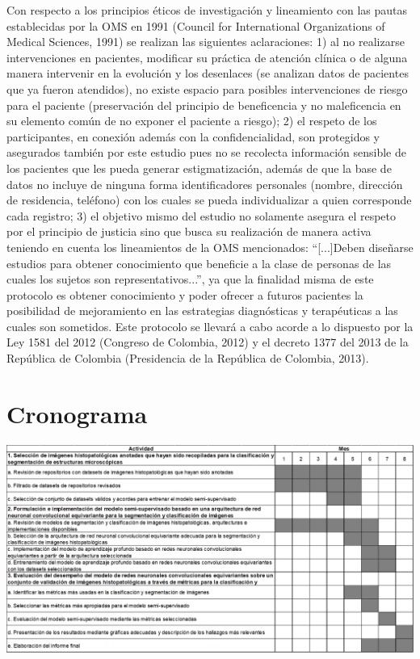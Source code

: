 \documentclass[12pt,letterpaper,final, openany]{scrbook}
\begin{document}
Con respecto a los principios éticos de investigación y lineamiento con las pautas establecidas por la OMS en 1991 (Council for International Organizations of Medical Sciences, 1991) se realizan las siguientes aclaraciones: 1) al no realizarse intervenciones en pacientes, modificar su práctica de atención clínica o de alguna manera intervenir en la evolución y los desenlaces (se analizan datos de pacientes que ya fueron atendidos), no existe espacio para posibles intervenciones de riesgo para el paciente (preservación del principio de beneficencia y no maleficencia en su elemento común de no exponer el paciente a riesgo); 2) el respeto de los participantes, en conexión además con la confidencialidad, son protegidos y asegurados también por este estudio pues no se recolecta información sensible de los pacientes que les pueda generar estigmatización, además de que la base de datos no incluye de ninguna forma identificadores personales (nombre, dirección de residencia, teléfono) con los cuales se pueda individualizar a quien corresponde cada registro; 3) el objetivo mismo del estudio no solamente asegura el respeto por el principio de justicia sino que busca su realización de manera activa teniendo en cuenta los lineamientos de la OMS mencionados: ``[...]Deben diseñarse estudios para obtener conocimiento que beneficie a la clase de personas de las cuales los sujetos son representativos...”, ya que la finalidad misma de este protocolo es obtener conocimiento y poder ofrecer a futuros pacientes la posibilidad de mejoramiento en las estrategias diagnósticas y terapéuticas a las cuales son sometidos.
Este protocolo se llevará a cabo acorde a lo dispuesto por la Ley 1581 del 2012 (Congreso de Colombia, 2012) y el decreto 1377 del 2013 de la República de Colombia (Presidencia de la República de Colombia, 2013).


\chapter{Cronograma}

\begin{center}
\includegraphics[width=1\textwidth]{cronograma f.png}
\end{center}
\end{document}
